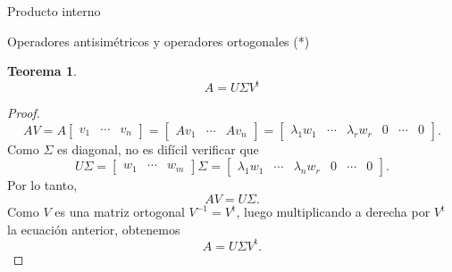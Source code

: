 \documentclass[a4paper,12pt,twoside,spanish,reqno]{amsbook}
\numberwithin{equation}{section}
\newtheorem{teorema}{Teorema}[section]
\theoremstyle{definition}
\theoremstyle{remark}
\renewcommand{\t}{{\operatorname{t}}}
\begin{document}
\begin{chapter}{Producto interno}
\begin{section}{Operadores antisimétricos y operadores ortogonales (*)}
        \begin{teorema}
            $$A = U\Sigma V^{\t}$$ 
        \end{teorema}
        \begin{proof}
            $$
            AV = A \begin{bmatrix}
            v_1 & \cdots & v_n
            \end{bmatrix}
            =
             \begin{bmatrix}
            Av_1 & \cdots & Av_n
            \end{bmatrix}
            =
            \begin{bmatrix}
            \lambda_1 w_1& \cdots & \lambda_r w_r& 0 &\cdots &0
            \end{bmatrix}.
            $$
            Como $\Sigma$  es diagonal, no es difícil verificar que 
            $$
            U\Sigma = \begin{bmatrix}
            w_1 & \cdots &  w_m
            \end{bmatrix}\Sigma = \begin{bmatrix}
            \lambda_1 w_1& \cdots & \lambda_n w_r& 0 &\cdots &0
            \end{bmatrix}.
            $$
            Por lo tanto,
            $$
            AV = U\Sigma.
            $$
            Como $V$ es una matriz ortogonal $V^{-1}= V^{\t}$, luego  multiplicando  a derecha por $V^{\t}$ la ecuación anterior, obtenemos
            $$
            A = U\Sigma V^{\t}.
            $$    
        \end{proof}
        
    \end{section}



\end{chapter}



\appendix
\setcounter{chapter}{0}
\renewcommand{\thechapter}{\Alph{chapter}}
\end{document}
